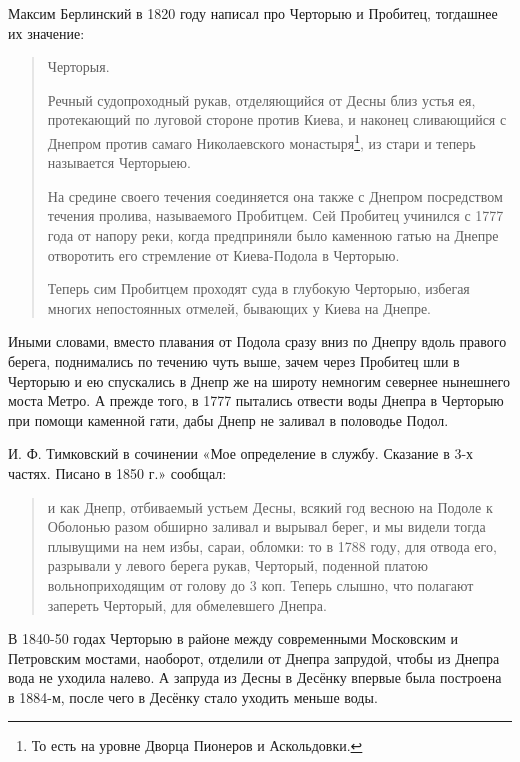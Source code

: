 Максим Берлинский в 1820 году написал\cite{berl01} про Черторыю и Пробитец, тогдашнее их значение:

\begin{quotation}
Черторыя.

Речный судопроходный рукав, отделяющийся от Десны близ устья ея, протекающий по луговой стороне против Киева, и наконец сливающийся с Днепром против самаго Николаевского монастыря\footnote{То есть на уровне Дворца Пионеров и Аскольдовки.}, из стари и теперь называется Черторыею.

На средине своего течения соединяется она также с Днепром  посредством течения пролива, называемого Пробитцем. Сей Пробитец учинился с 1777 года от напору реки, когда предприняли было каменною гатью на Днепре отворотить его стремление от Киева-Подола в Черторыю.

Теперь сим Пробитцем проходят суда в глубокую Черторыю, избегая многих непостоянных отмелей, бывающих у Киева на Днепре.
\end{quotation}

Иными словами, вместо плавания от Подола сразу вниз по Днепру вдоль правого берега, поднимались по течению чуть выше, зачем через Пробитец шли в Черторыю и ею спускались в Днепр же на широту немногим севернее нынешнего моста Метро. А прежде того, в 1777 пытались отвести воды Днепра в Черторыю при помощи каменной гати, дабы Днепр не заливал в половодье Подол.

И. Ф. Тимковский в сочинении «Мое определение в службу. Сказание в 3-х частях. Писано в 1850 г.» сообщал:

\begin{quotation}
и как Днепр, отбиваемый устьем Десны, всякий год весною на Подоле к Оболонью разом обширно заливал и вырывал берег, и мы видели тогда плывущими на нем избы, сараи, обломки: то в 1788 году, для отвода его, разрывали у левого берега рукав, Черторый, поденной платою вольноприходящим от голову до 3 коп. Теперь слышно, что полагают запереть Черторый, для обмелевшего Днепра.
\end{quotation}

В 1840-50 годах Черторыю в районе между современными Московским и Петровским мостами, наоборот, отделили от Днепра запрудой, чтобы из Днепра вода не уходила налево. А запруда из Десны в Десёнку впервые была построена в 1884-м, после чего в Десёнку стало уходить меньше воды.



